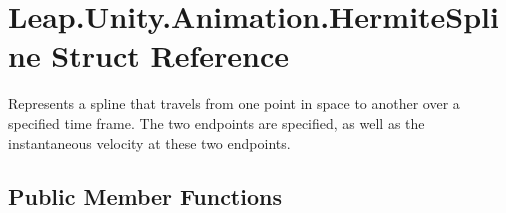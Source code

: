 \hypertarget{struct_leap_1_1_unity_1_1_animation_1_1_hermite_spline}{}\section{Leap.\+Unity.\+Animation.\+Hermite\+Spline Struct Reference}
\label{struct_leap_1_1_unity_1_1_animation_1_1_hermite_spline}


Represents a spline that travels from one point in space to another over a specified time frame. The two endpoints are specified, as well as the instantaneous velocity at these two endpoints.  


\subsection*{Public Member Functions}
